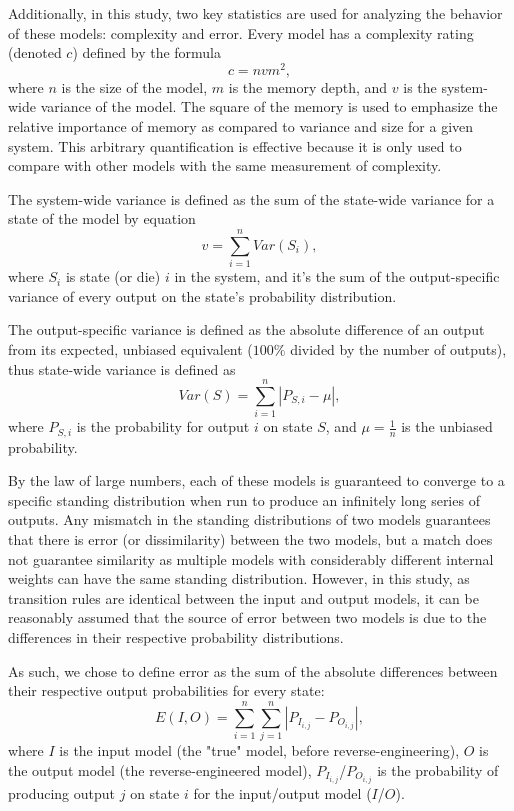 \documentclass[12pt]{article}
\begin{document}
Additionally, in this study, two key statistics are used for analyzing the behavior of these models: complexity and error. Every model has a complexity rating (denoted $c$) defined by the formula
\begin{equation}\label{eq:complexity}
c = nvm^2,
\end{equation}
where $n$ is the size of the model, $m$ is the memory depth, and $v$ is the system-wide variance of the model. The square of the memory is used to emphasize the relative importance of memory as compared to variance and size for a given system. This arbitrary quantification is effective because it is only used to compare with other models with the same measurement of complexity. 

The system-wide variance is defined as the sum of the state-wide variance for a state of the model by equation
\begin{equation}\label{eq:sw-variance}
    v = \sum_{i=1}^{n} Var(S_{i}),
\end{equation}
where $S_{i}$ is state (or die) $i$ in the system, and it's the sum of the output-specific variance of every output on the state's probability distribution.

The output-specific variance is defined as the absolute difference of an output from its expected, unbiased equivalent ($100\%$ divided by the number of outputs), thus state-wide variance is defined as
\begin{equation}\label{eq:ind-variance}
    Var(S) = \sum_{i=1}^{n} |P_{S,i} - \mu|,
\end{equation}
where $P_{S,i}$ is the probability for output $i$ on state $S$, and $\mu = \frac{1}{n}$ is the unbiased probability.

By the law of large numbers, each of these models is guaranteed to converge to a specific standing distribution when run to produce an infinitely long series of outputs\cite{tribello_law_2025}. Any mismatch in the standing distributions of two models guarantees that there is error (or dissimilarity) between the two models, but a match does not guarantee similarity as multiple models with considerably different internal weights can have the same standing distribution. However, in this study, as transition rules are identical between the input and output models, it can be reasonably assumed that the source of error between two models is due to the differences in their respective probability distributions.

As such, we chose to define error as the sum of the absolute differences between their respective output probabilities for every state:
\begin{equation}\label{eq:error}
    E(I,O) = \sum_{i=1}^{n} \sum_{j=1}^{n} |P_{I_{i,j}} - P_{O_{i,j}}|,
\end{equation}
where $I$ is the input model (the "true" model, before reverse-engineering), $O$ is the output model (the reverse-engineered model), $P_{I_{i,j}}$/$P_{O_{i,j}}$ is the probability of producing output $j$ on state $i$ for the input/output model ($I$/$O$).
\end{document}

